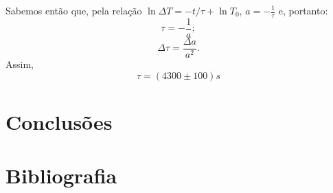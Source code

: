 \documentclass[12pt,a4paper]{article}
\begin{document}
Sabemos então que, pela relação $ \ln \Delta T = -t/\tau + \ln T_0 $, $a = -\frac{1}{\tau}$ e, portanto:
$$ \tau = -\frac{1}{a}; $$
$$ \Delta\tau =\frac{\Delta a}{a^2}. $$
Assim, 
$$ \tau = (4300 \pm 100)s $$

\section{Conclusões}


\section{Bibliografia}
\end{document}
